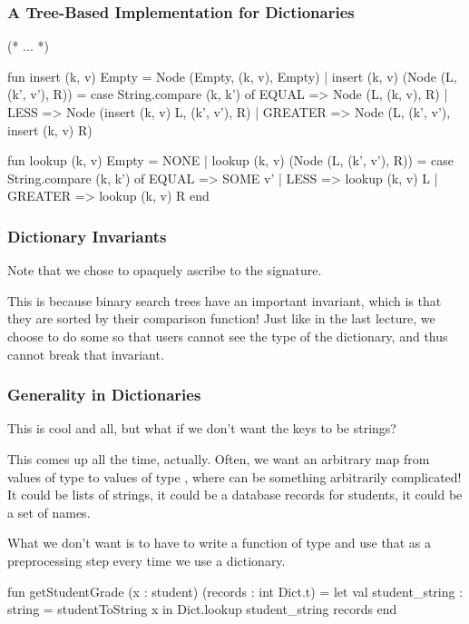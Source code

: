 \documentclass[aspectratio=169]{beamer}
\begin{document}
\begin{frame}[fragile]
  \frametitle{A Tree-Based Implementation for Dictionaries}
  \small
  \begin{codeblock}
    (* ... *)

      fun insert (k, v) Empty = Node (Empty, (k, v), Empty) 
        | insert (k, v) (Node (L, (k', v'), R)) =
            case String.compare (k, k') of
              EQUAL   => Node (L, (k, v), R)
            | LESS    => Node (insert (k, v) L, (k', v'), R)
            | GREATER => Node (L, (k', v'), insert (k, v) R) 

      fun lookup (k, v) Empty = NONE 
        | lookup (k, v) (Node (L, (k', v'), R)) =
            case String.compare (k, k') of
              EQUAL   => SOME v' 
            | LESS    => lookup (k, v) L
            | GREATER => lookup (k, v) R
    end
\end{codeblock}
\end{frame}

\begin{frame}[fragile]
  \frametitle{Dictionary Invariants}

  Note that we chose to opaquely ascribe to the  signature.

  This is because binary search trees have an important invariant, which
  is that they are sorted by their comparison function! Just like in the
  last lecture, we choose to do some  so that
  users cannot see the type of the dictionary, and thus cannot break that
  invariant.
\end{frame}


\begin{frame}[fragile]
  \frametitle{Generality in Dictionaries}

  This is cool and all, but what if we don't want the keys to be strings?

  This comes up all the time, actually. Often, we want an arbitrary map
  from values of type  to values of type , where 
   can be something arbitrarily complicated! It could be lists of
  strings, it could be a database records for students, it could be a set
  of names.

  What we don't want is to have to write a function of type 
  and use that as a preprocessing step every time we use a dictionary. 

  \begin{codeblock}
    fun getStudentGrade (x : student) (records : int Dict.t) =
      let
        val student_string : string = studentToString x
      in 
        Dict.lookup student_string records
      end
  \end{codeblock}
\end{frame}
\end{document}
